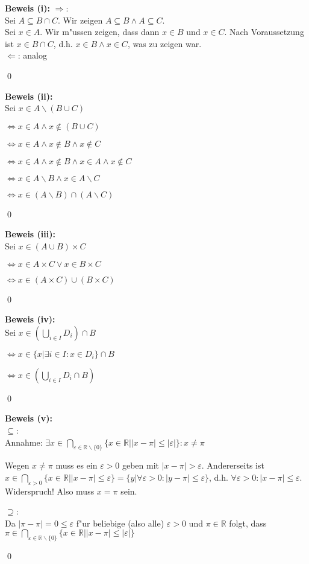 \begin{loesung}
  \textbf{Beweis (i):}
  \glqq$\Rightarrow$\grqq:\\
  Sei $A\subseteq B\cap C$. Wir zeigen $A\subseteq B\wedge A\subseteq C$.\\
  Sei $x\in A$. Wir m"ussen zeigen, dass dann $x\in B$ und $x\in C$. Nach Voraussetzung ist $x\in B\cap C$, d.h. $x\in B\wedge x\in C$, was zu zeigen war. \\
  \glqq$\Leftarrow$\grqq: analog
  
  \qed

  \textbf{Beweis (ii):}\\
  Sei $x\in A\backslash (B\cup C)$

  $\Leftrightarrow x\in A\wedge x \notin (B\cup C)$
  
  $\Leftrightarrow x\in A\wedge x \notin B \wedge x\notin C$

  $\Leftrightarrow x\in A\wedge x\notin B\wedge x\in A\wedge x\notin C$

  $\Leftrightarrow x\in A\backslash B\wedge x\in A\backslash C$

  $\Leftrightarrow x\in (A\backslash B)\cap (A\backslash C)$
  
  \qed

  \textbf{Beweis (iii):}\\
  Sei $x\in (A\cup B)\times C$

  $\Leftrightarrow x\in A\times C\vee x\in B\times C$

  $\Leftrightarrow x\in (A\times C)\cup (B\times C)$
  
  \qed

  \textbf{Beweis (iv):}\\
  Sei $x\in (\bigcup_{i\in I}D_i)\cap B$

  $\Leftrightarrow x\in \{x|\exists i\in I:x\in D_i\}\cap B$

  $\Leftrightarrow x\in (\bigcup_{i\in I}D_i\cap B)$
  
  \qed

  \textbf{Beweis (v):}\\
  \glqq $\subseteq$\grqq:\\
  Annahme: $\exists x\in\bigcap_{\varepsilon\in\mathbb{R}\backslash\{0\}}\{x\in\mathbb{R}||x-\pi|\leq |\varepsilon|\}:x\neq\pi$

  Wegen $x\neq\pi$ muss es ein $\varepsilon>0$ geben mit $|x-\pi|>\varepsilon$. Andererseits ist $x\in\bigcap_{\varepsilon>0}\{x\in\mathbb{R}||x-\pi|\leq \varepsilon\}=\{y|\forall\varepsilon>0:|y-\pi|\leq \varepsilon\}$, 
  d.h. $\forall\varepsilon>0:|x-\pi|\leq\varepsilon$. Widerspruch! Also muss $x=\pi$ sein.

  \glqq $\supseteq$\grqq:\\
  Da $|\pi-\pi|=0\leq\varepsilon$ f"ur beliebige (also alle) $\varepsilon>0$ und $\pi\in\mathbb{R}$ folgt, dass $\pi\in\bigcap_{\varepsilon\in\mathbb{R}\backslash\{0\}}\{x\in\mathbb{R}||x-\pi|\leq |\varepsilon|\}$
  
  \qed
\end{loesung}

